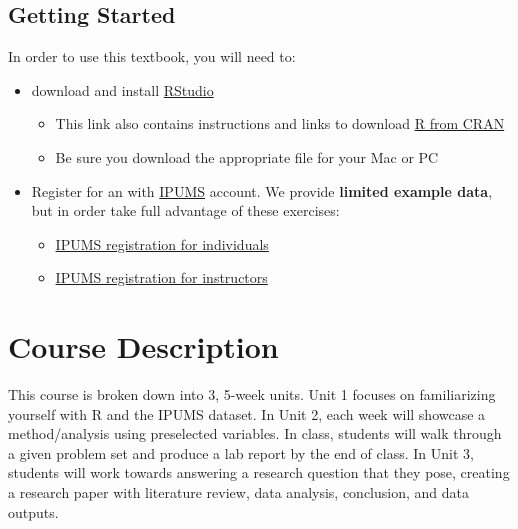 \documentclass[
]{book}
\providecommand{\tightlist}{%
  \setlength{\itemsep}{0pt}\setlength{\parskip}{0pt}}
\begin{document}
\hypertarget{getting-started}{%
\subsection*{Getting Started}\label{getting-started}}

In order to use this textbook, you will need to:

\begin{itemize}
\tightlist
\item
  download and install \href{https://posit.co/download/rstudio-desktop/}{RStudio}

  \begin{itemize}
  \tightlist
  \item
    This link also contains instructions and links to download \href{https://cran.rstudio.com/}{R from CRAN}
  \item
    Be sure you download the appropriate file for your Mac or PC
  \end{itemize}
\item
  Register for an with \href{https://ipums.org}{IPUMS} account. We provide \textbf{limited example data}, but in order take full advantage of these exercises:

  \begin{itemize}
  \tightlist
  \item
    \href{https://international.ipums.org/international-action/menu}{IPUMS registration for individuals}
  \item
    \href{https://international.ipums.org/international/classroom_accounts.shtml}{IPUMS registration for instructors}
  \end{itemize}
\end{itemize}

\hypertarget{course-description}{%
\section*{Course Description}\label{course-description}}

This course is broken down into 3, 5-week units. Unit 1 focuses on familiarizing yourself with R and the IPUMS dataset. In Unit 2, each week will showcase a method/analysis using preselected variables. In class, students will walk through a given problem set and produce a lab report by the end of class. In Unit 3, students will work towards answering a research question that they pose, creating a research paper with literature review, data analysis, conclusion, and data outputs.
\end{document}
